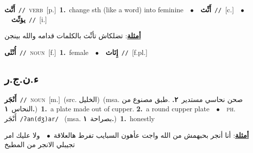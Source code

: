 \documentclass[10pt,a4paper,twoside]{article} %
\begin{document}
\begin{multicols}{2}
{\setlength\topsep{0pt}\textbf{\foreignlanguage{arabic}{أَنَّث}}\ {\color{gray}\texttt{//}\color{black}}\ \textsc{verb}\ [p.]\ \textbf{1.}~change sth (like a word) into feminine\ \ $\bullet$\ \ \setlength\topsep{0pt}\textbf{\foreignlanguage{arabic}{أَنِّث}}\ {\color{gray}\texttt{//}\color{black}}\ [c.]\ \ $\bullet$\ \ \setlength\topsep{0pt}\textbf{\foreignlanguage{arabic}{يؤنِّث}}\ {\color{gray}\texttt{//}\color{black}}\ [i.]\  \begin{flushright}\color{gray}\foreignlanguage{arabic}{\textbf{\underline{\foreignlanguage{arabic}{أمثلة}}}: تضلكاش تأنِّث بالكلمات قدامه والله بينجن}\end{flushright}\color{black}} \vspace{2mm}

{\setlength\topsep{0pt}\textbf{\foreignlanguage{arabic}{أُنْثَى}}\ {\color{gray}\texttt{//}\color{black}}\ \textsc{noun}\ [f.]\ \textbf{1.}~female\ \ $\bullet$\ \ \setlength\topsep{0pt}\textbf{\foreignlanguage{arabic}{إِنَاث}}\ {\color{gray}\texttt{//}\color{black}}\ [f.pl.]\ } \vspace{2mm}

\vspace{-3mm}
\subsection*{\color{blue}\foreignlanguage{arabic}{ء.ن.ج.ر}\color{blue}{ (ntws)}} 

{\setlength\topsep{0pt}\textbf{\foreignlanguage{arabic}{أَنْجَر}}\ {\color{gray}\texttt{//}\color{black}}\ \textsc{noun}\ [m.]\ (src. \color{gray}\foreignlanguage{arabic}{الخليل}\color{black})\ \color{gray}(msa. \foreignlanguage{arabic}{صحن نحاسي مستدير}~\foreignlanguage{arabic}{\textbf{٢.}}  .\foreignlanguage{arabic}{طبق مصنوع من النحاس}~\foreignlanguage{arabic}{\textbf{١.}})\color{black}\ \textbf{1.}~a plate made out of cupper.  \textbf{2.}~a round cupper plate\ \ $\bullet$\ \ \textsc{ph.} \color{gray} \foreignlanguage{arabic}{أَنْجَر}\color{black}\ {\color{gray}\texttt{/{\sffamily ʔan(dʒ)ar}/}\color{black}}\ \color{gray} (msa. \foreignlanguage{arabic}{بصراحة}~\foreignlanguage{arabic}{\textbf{١.}})\color{black}\ \textbf{1.}~honestly\  \begin{flushright}\color{gray}\foreignlanguage{arabic}{\textbf{\underline{\foreignlanguage{arabic}{أمثلة}}}: أنا أنجر بحبهمش من الله واجت عأهون السبايب تفرط هالعلاقة\ $\bullet$\ \  ولا عليك امر تجيبلي الانجر من المطبخ}\end{flushright}\color{black}} \vspace{2mm}


\end{multicols}
\end{document}
